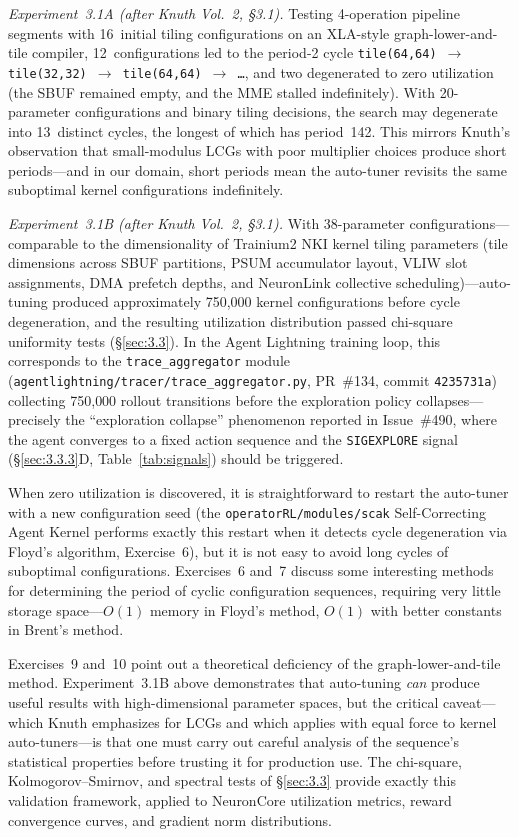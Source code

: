 \documentclass[12pt]{article}
\newcommand{\SBUF}{\textsc{SBUF}}                 %
\newcommand{\PSUM}{\textsc{PSUM}}                 %
\newcommand{\MME}{\textsc{MME}}                   %
\begin{document}
\medskip\noindent\textit{Experiment~3.1A (after Knuth Vol.~2, \S3.1).} Testing 4-operation pipeline segments with 16~initial tiling configurations on an XLA-style graph-lower-and-tile compiler, 12~configurations led to the period-2 cycle \texttt{tile(64,64) $\to$ tile(32,32) $\to$ tile(64,64) $\to$ \ldots}, and two degenerated to zero utilization (the \SBUF{} remained empty, and the \MME{} stalled indefinitely). With 20-parameter configurations and binary tiling decisions, the search may degenerate into 13~distinct cycles, the longest of which has period~142. This mirrors Knuth's observation that small-modulus LCGs with poor multiplier choices produce short periods---and in our domain, short periods mean the auto-tuner revisits the same suboptimal kernel configurations indefinitely.

\medskip\noindent\textit{Experiment~3.1B (after Knuth Vol.~2, \S3.1).} With 38-parameter configurations---comparable to the dimensionality of Trainium2 NKI kernel tiling parameters (tile dimensions across \SBUF{} partitions, \PSUM{} accumulator layout, VLIW slot assignments, DMA prefetch depths, and NeuronLink collective scheduling)---auto-tuning produced approximately 750{,}000 kernel configurations before cycle degeneration, and the resulting utilization distribution passed chi-square uniformity tests (\S\ref{sec:3.3}). In the Agent Lightning training loop, this corresponds to the \texttt{trace\_aggregator} module (\texttt{agentlightning/tracer/trace\_aggregator.py}, PR~\#134, commit \texttt{4235731a}) collecting 750{,}000 rollout transitions before the exploration policy collapses---precisely the ``exploration collapse'' phenomenon reported in Issue~\#490, where the agent converges to a fixed action sequence and the \texttt{SIGEXPLORE} signal (\S\ref{sec:3.3.3}D, Table~\ref{tab:signals}) should be triggered.

When zero utilization is discovered, it is straightforward to restart the auto-tuner with a new configuration seed (the \texttt{operatorRL/modules/scak} Self-Correcting Agent Kernel performs exactly this restart when it detects cycle degeneration via Floyd's algorithm, Exercise~6), but it is not easy to avoid long cycles of suboptimal configurations. Exercises~6 and~7 discuss some interesting methods for determining the period of cyclic configuration sequences, requiring very little storage space---$O(1)$ memory in Floyd's method, $O(1)$ with better constants in Brent's method.

Exercises~9 and~10 point out a theoretical deficiency of the graph-lower-and-tile method. Experiment~3.1B above demonstrates that auto-tuning \emph{can} produce useful results with high-dimensional parameter spaces, but the critical caveat---which Knuth emphasizes for LCGs and which applies with equal force to kernel auto-tuners---is that one must carry out careful analysis of the sequence's statistical properties before trusting it for production use. The chi-square, Kolmogorov--Smirnov, and spectral tests of \S\ref{sec:3.3} provide exactly this validation framework, applied to NeuronCore utilization metrics, reward convergence curves, and gradient norm distributions.
\end{document}
